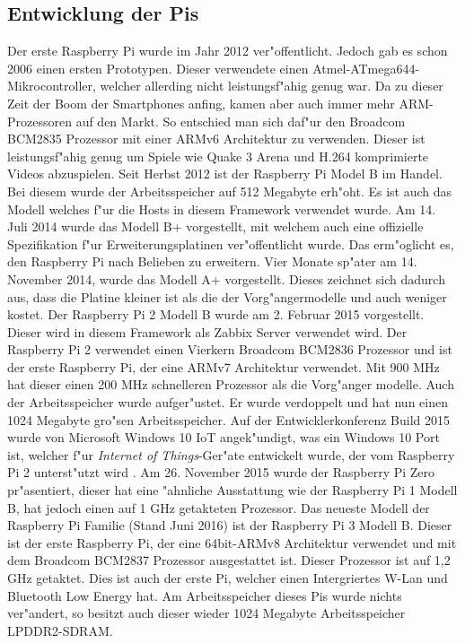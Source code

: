 \subsection{Entwicklung der Pis}
Der erste Raspberry Pi wurde im Jahr 2012 ver"offentlicht. Jedoch gab es schon 2006 einen ersten Prototypen. %
Dieser verwendete einen Atmel-ATmega644-Mikrocontroller, welcher allerding nicht leistungsf"ahig genug war. %
Da zu dieser Zeit der Boom der Smartphones anfing, kamen aber auch immer mehr ARM-Prozessoren auf den Markt. %
So entschied man sich daf"ur den Broadcom BCM2835 Prozessor mit einer ARMv6 Architektur zu verwenden. Dieser ist leistungsf"ahig genug %
um Spiele wie Quake 3 Arena und H.264 komprimierte Videos abzuspielen. Seit Herbst 2012 ist der Raspberry Pi Model B im Handel. %
Bei diesem wurde der Arbeitsspeicher auf 512 Megabyte erh"oht. Es ist auch das Modell welches f"ur die Hosts in %
diesem Framework verwendet wurde. Am 14. Juli 2014 wurde das Modell B+ vorgestellt, mit welchem auch eine %
offizielle Spezifikation f"ur Erweiterungsplatinen ver"offentlicht wurde. Das erm"oglicht es, den Raspberry Pi %
nach Belieben zu erweitern. Vier Monate sp"ater am 14. November 2014, wurde das Modell A+ vorgestellt. Dieses %
zeichnet sich dadurch aus, dass die Platine kleiner ist als die der Vorg"angermodelle und auch weniger %
kostet. Der Raspberry Pi 2 Modell B wurde am 2. Februar 2015 vorgestellt. Dieser wird in diesem Framework als Zabbix %
Server verwendet wird. Der Raspberry Pi 2 verwendet einen Vierkern Broadcom BCM2836 Prozessor und ist der erste Raspberry Pi, %
der eine ARMv7 Architektur verwendet. Mit 900 MHz hat dieser einen 200 MHz schnelleren Prozessor als die Vorg"anger%
modelle. Auch der Arbeitsspeicher wurde aufger"ustet. Er wurde verdoppelt und hat nun einen 1024 Megabyte %
gro"sen Arbeitsspeicher. Auf der Entwicklerkonferenz Build 2015 wurde von Microsoft Windows 10 IoT angek"undigt, was %
ein Windows 10 Port ist, welcher f"ur \emph{Internet of Things}-Ger"ate entwickelt wurde, der vom Raspberry Pi 2 %
unterst"utzt wird \autocite{web:winIoT}. Am 26. November 2015 wurde der Raspberry Pi Zero pr"asentiert, dieser hat %
eine "ahnliche Ausstattung wie der Raspberry Pi 1 Modell B, hat jedoch einen auf 1 GHz getakteten Prozessor. %
Das neueste Modell der Raspberry Pi Familie (Stand Juni 2016) ist der Raspberry Pi 3 Modell B. Dieser ist %
der erste Raspberry Pi, der eine 64bit-ARMv8 Architektur verwendet und mit dem Broadcom BCM2837 Prozessor ausgestattet ist. %
Dieser Prozessor ist auf 1,2 GHz getaktet. Dies ist auch der erste Pi, welcher einen Intergriertes W-Lan und %
Bluetooth Low Energy hat. Am Arbeitsspeicher dieses Pis wurde nichts ver"andert, so besitzt auch dieser wieder 1024 Megabyte Arbeitsspeicher %
LPDDR2-SDRAM.
 
